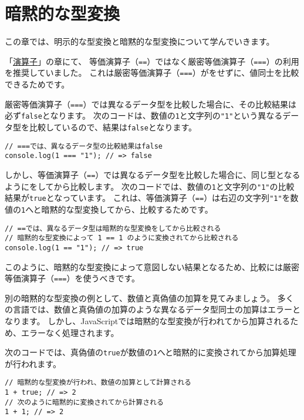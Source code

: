 \hypertarget{implicit-coercion}{%
\chapter{暗黙的な型変換}\label{implicit-coercion}}
\thispagestyle{frontheadings}

この章では、明示的な型変換と暗黙的な型変換について学んでいきます。

「\hyperlink{operator}{演算子}」の章にて、
等価演算子（\texttt{==}）ではなく厳密等価演算子（\texttt{===}）の利用を推奨していました。
これは厳密等価演算子（\texttt{===}）が\textbf{}をせずに、値同士を比較できるためです。

厳密等価演算子（\texttt{===}）では異なるデータ型を比較した場合に、その比較結果は必ず\texttt{false}となります。
次のコードは、数値の\texttt{1}と文字列の\texttt{"1"}という異なるデータ型を比較しているので、結果は\texttt{false}となります。

\begin{lstlisting}
// ===では、異なるデータ型の比較結果はfalse
console.log(1 === "1"); // => false
\end{lstlisting}

しかし、等価演算子（\texttt{==}）では異なるデータ型を比較した場合に、同じ型となるように\textbf{}をしてから比較します。
次のコードでは、数値の\texttt{1}と文字列の\texttt{"1"}の比較結果が\texttt{true}となっています。
これは、等価演算子（\texttt{==}）は右辺の文字列\texttt{"1"}を数値の\texttt{1}へと暗黙的な型変換してから、比較するためです。

\begin{lstlisting}
// ==では、異なるデータ型は暗黙的な型変換をしてから比較される
// 暗黙的な型変換によって 1 == 1 のように変換されてから比較される
console.log(1 == "1"); // => true
\end{lstlisting}

このように、暗黙的な型変換によって意図しない結果となるため、比較には厳密等価演算子（\texttt{===}）を使うべきです。

別の暗黙的な型変換の例として、数値と真偽値の加算を見てみましょう。
多くの言語では、数値と真偽値の加算のような異なるデータ型同士の加算はエラーとなります。
しかし、JavaScriptでは暗黙的な型変換が行われてから加算されるため、エラーなく処理されます。

次のコードでは、真偽値の\texttt{true}が数値の\texttt{1}へと暗黙的に変換されてから加算処理が行われます。

\begin{lstlisting}
// 暗黙的な型変換が行われ、数値の加算として計算される
1 + true; // => 2
// 次のように暗黙的に変換されてから計算される
1 + 1; // => 2
\end{lstlisting}

